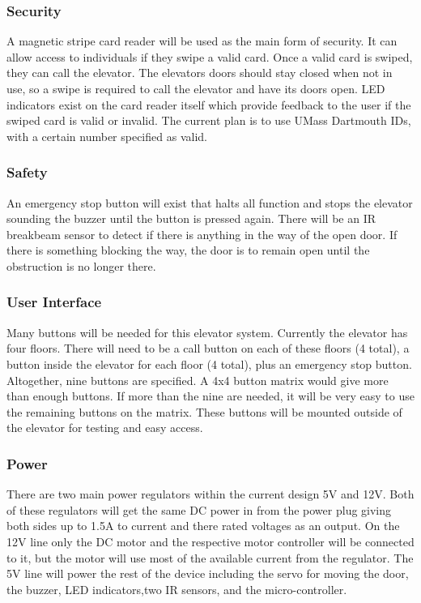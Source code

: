 \documentclass{article}
\begin{document}
	    \subsubsection{Security}
	    A magnetic stripe card reader will be used as the main form of security. It can allow access to individuals if they swipe a valid card. Once a valid card is swiped, they can call the elevator. The elevators doors should stay closed when not in use, so a swipe is required to call the elevator and have its doors open. LED indicators exist on the card reader itself which provide feedback to the user if the swiped card is valid or invalid. The current plan is to use UMass Dartmouth IDs, with a certain number specified as valid.
	    
	    \subsubsection{Safety}
	    An emergency stop button will exist that halts all function and stops the elevator sounding the buzzer until the button is pressed again. There will be an IR breakbeam sensor to detect if there is anything in the way of the open door. If there is something blocking the way, the door is to remain open until the obstruction is no longer there.
	    
	    \subsubsection{User Interface}
	    Many buttons will be needed for this elevator system. Currently the elevator has four floors. There will need to be a call button on each of these floors (4 total), a button inside the elevator for each floor (4 total), plus an emergency stop button. Altogether, nine buttons are specified. A 4x4 button matrix would give more than enough buttons. If more than the nine are needed, it will be very easy to use the remaining buttons on the matrix. These buttons will be mounted outside of the elevator for testing and easy access.
	    
	    
	    
	    \subsubsection{Power}
	    There are two main power regulators within the current design 5V and 12V. Both of these regulators will get the same DC power in from the power plug giving both sides up to 1.5A to current and there rated voltages as an output. On the 12V line only the DC motor and the respective motor controller will be connected to it, but the motor will use most of the available current from the regulator. The 5V line will power the rest of the device including the servo for moving the door, the buzzer, LED indicators,two IR sensors, and the micro-controller.
	    
\end{document}
